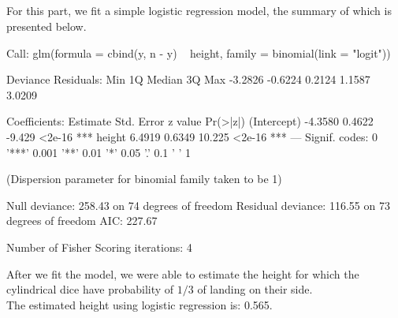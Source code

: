 \documentclass{article}
\begin{document}
\subsection{}
For this part, we fit a simple logistic regression model, the summary of which is presented below. 
\begin{Schunk}
\begin{Soutput}
Call:
glm(formula = cbind(y, n - y) ~ height, family = binomial(link = "logit"))

Deviance Residuals: 
    Min       1Q   Median       3Q      Max  
-3.2826  -0.6224   0.2124   1.1587   3.0209  

Coefficients:
            Estimate Std. Error z value Pr(>|z|)    
(Intercept)  -4.3580     0.4622  -9.429   <2e-16 ***
height        6.4919     0.6349  10.225   <2e-16 ***
---
Signif. codes:  0 '***' 0.001 '**' 0.01 '*' 0.05 '.' 0.1 ' ' 1

(Dispersion parameter for binomial family taken to be 1)

    Null deviance: 258.43  on 74  degrees of freedom
Residual deviance: 116.55  on 73  degrees of freedom
AIC: 227.67

Number of Fisher Scoring iterations: 4
\end{Soutput}
\end{Schunk}
After we fit the model, we were able to estimate the height for which the cylindrical dice have probability of $1/3$ of landing on their side.\\
The estimated height using logistic regression is: 0.565.
\end{document}
